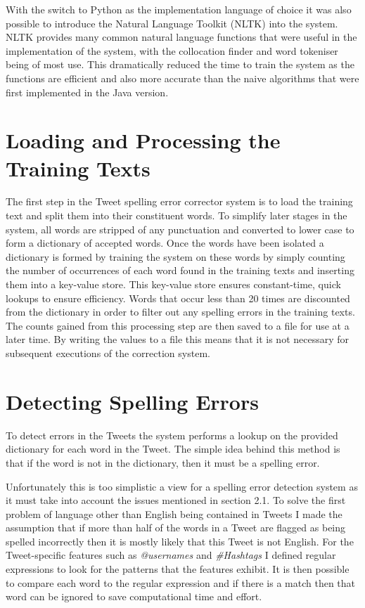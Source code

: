 With the switch to Python as the implementation language of choice it was also possible to introduce the Natural Language Toolkit (NLTK) \cite{} into the system. NLTK provides many common natural language functions that were useful in the implementation of the system, with the collocation finder and word tokeniser being of most use. This dramatically reduced the time to train the system as the functions are efficient and also more accurate than the naive algorithms that were first implemented in the Java version.

\section{Loading and Processing the Training Texts}
The first step in the Tweet spelling error corrector system is to load the training text and split them into their constituent words. To simplify later stages in the system, all words are stripped of any punctuation and converted to lower case to form a dictionary of accepted words. Once the words have been isolated a dictionary is formed by training the system on these words by simply counting the number of occurrences of each word found in the training texts and inserting them into a key-value store. This key-value store ensures constant-time, quick lookups to ensure efficiency. Words that occur less than 20 times are discounted from the dictionary in order to filter out any spelling errors in the training texts. The counts gained from this processing step are then saved to a file for use at a later time. By writing the values to a file this means that it is not necessary for subsequent executions of the correction system.

\section{Detecting Spelling Errors}
To detect errors in the Tweets the system performs a lookup on the provided dictionary for each word in the Tweet. The simple idea behind this method is that if the word is not in the dictionary, then it must be a spelling error.

Unfortunately this is too simplistic a view for a spelling error detection system as it must take into account the issues mentioned in section 2.1. To solve the first problem of language other than English being contained in Tweets I made the assumption that if more than half of the words in a Tweet are flagged as being spelled incorrectly then it is mostly likely that this Tweet is not English. For the Tweet-specific features such as \emph{@usernames} and \emph{\#Hashtags} I defined regular expressions to look for the patterns that the features exhibit. It is then possible to compare each word to the regular expression and if there is a match then that word can be ignored to save computational time and effort.

